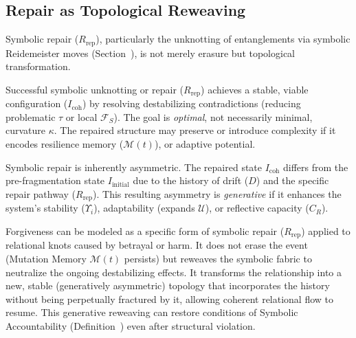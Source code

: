 \subsection{Repair as Topological Reweaving}
\label{subsec:bk9_repair_as_topological_reweaving}
Symbolic repair ($R_{\text{rep}}$), particularly the unknotting of entanglements via symbolic Reidemeister moves (Section~), is not merely erasure but topological transformation. %
\begin{proposition}
\label{prop:bk9_curvature_resilience_bound}
Successful symbolic unknotting or repair ($R_{\text{rep}}$) achieves a stable, viable configuration ($I_{\text{coh}}$) by resolving destabilizing contradictions (reducing problematic $\tau$ or local $\mathcal{F}_S$). The goal is \emph{optimal}, not necessarily minimal, curvature $\kappa$. The repaired structure may preserve or introduce complexity if it encodes resilience
memory ($\mathcal{M}(t)$), or adaptive potential.
\end{proposition}
\begin{definition}
\label{definition:bk9_generative_asymmetry}
Symbolic repair is inherently asymmetric. The repaired state $I_{\text{coh}}$ differs from the pre-fragmentation state $I_{\text{initial}}$ due to the history of drift ($D$) and the specific repair pathway ($R_{\text{rep}}$). This resulting asymmetry is \emph{generative} if it enhances the system's stability ($\Upsilon_i$), adaptability (expands $\mathcal{U}$), or reflective capacity ($C_R$).
\end{definition}
\begin{scholium}
\label{sch:bk9_forgiveness_as_reweaving}
Forgiveness can be modeled as a specific form of symbolic repair ($R_{\text{rep}}$) applied to relational knots caused by betrayal or harm. It does not erase the event (Mutation Memory $\mathcal{M}(t)$ persists) but reweaves the symbolic fabric to neutralize the ongoing destabilizing effects. It transforms the relationship into a new, stable (generatively asymmetric) topology that incorporates the history without being perpetually fractured by it, allowing coherent relational flow to resume. This generative reweaving can restore conditions of Symbolic Accountability (Definition~) even after structural violation.
\end{scholium}
